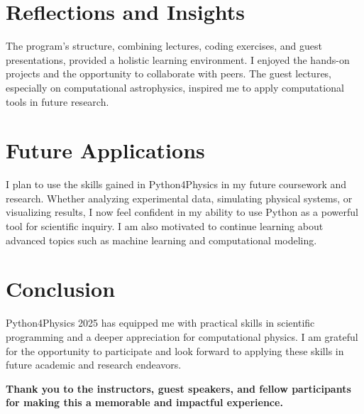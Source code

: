 \documentclass[12pt]{article}
\begin{document}
\section*{Reflections and Insights}
The program’s structure, combining lectures, coding exercises, and guest presentations, provided a holistic learning environment. I enjoyed the hands-on projects and the opportunity to collaborate with peers. The guest lectures, especially on computational astrophysics, inspired me to apply computational tools in future research.

\section*{Future Applications}
I plan to use the skills gained in Python4Physics in my future coursework and research. Whether analyzing experimental data, simulating physical systems, or visualizing results, I now feel confident in my ability to use Python as a powerful tool for scientific inquiry. I am also motivated to continue learning about advanced topics such as machine learning and computational modeling.

\section*{Conclusion}
Python4Physics 2025 has equipped me with practical skills in scientific programming and a deeper appreciation for computational physics. I am grateful for the opportunity to participate and look forward to applying these skills in future academic and research endeavors.

\vspace{1em}
\noindent\textbf{Thank you to the instructors, guest speakers, and fellow participants for making this a memorable and impactful experience.}
\end{document}
